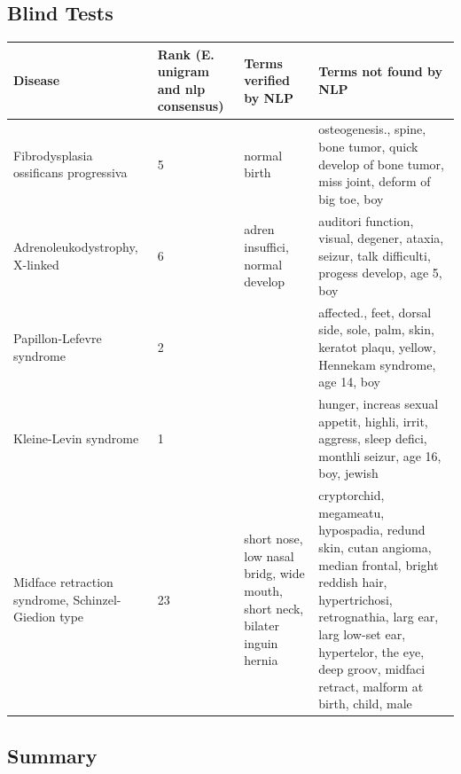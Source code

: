 \documentclass[10pt,letterpaper,two column,final]{article}
\begin{document}
\subsection{Blind Tests}
\label{app:blind_tfidf_tfidfrecalc}
\begin{center}
\begin{small}
	\begin{longtable}{|p{3.5cm}|p{1.5cm}|p{3cm}|p{3cm}|}
	\hline
	\textbf{Disease}  & \textbf{Rank (E. unigram and nlp consensus)} & \textbf{Terms verified by NLP}  & \textbf{Terms not found by NLP} \\
	\hline\hline
Fibrodysplasia ossificans progressiva & 5 & normal birth & osteogenesis., spine, bone tumor, quick develop of bone tumor, miss joint, deform of big toe, boy \\ \hline
Adrenoleukodystrophy, X-linked & 6 & adren insuffici, normal develop & auditori function, visual, degener, ataxia, seizur, talk difficulti, progess develop, age 5, boy \\ \hline
Papillon-Lefevre syndrome & 2 &  & affected., feet, dorsal side, sole, palm, skin, keratot plaqu, yellow, Hennekam syndrome, age 14, boy \\ \hline
Kleine-Levin syndrome & 1 &  & hunger, increas sexual appetit, highli, irrit, aggress, sleep defici, monthli seizur, age 16, boy, jewish \\ \hline
Midface retraction syndrome, Schinzel-Giedion type & 23 & short nose, low nasal bridg, wide mouth, short neck, bilater inguin hernia & cryptorchid, megameatu, hypospadia, redund skin, cutan angioma, median frontal, bright reddish hair, hypertrichosi, retrognathia, larg ear, larg low-set ear, hypertelor, the eye, deep groov, midfaci retract, malform at birth, child, male \\ \hline
	\end{longtable}
\end{small}
\end{center}

\subsection{Summary}
\label{app:summary_tfidf_tfidfrecalc}
\end{document}
